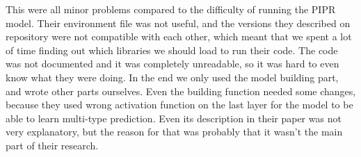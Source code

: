 This were all minor problems compared to the difficulty of running the PIPR model. Their environment file was not useful, and the versions they described on repository were not compatible with each other, which meant that we spent a lot of time finding out which libraries we should load to run their code. The code was not documented and it was completely unreadable, so it was hard to even know what they were doing. In the end we only used the model building part, and wrote other parts ourselves. Even the building function needed some changes, because they used wrong activation function on the last layer for the model to be able to learn multi-type prediction. Even its description in their paper was not very explanatory, but the reason for that was probably that it wasn't the main part of their research.

%
%




